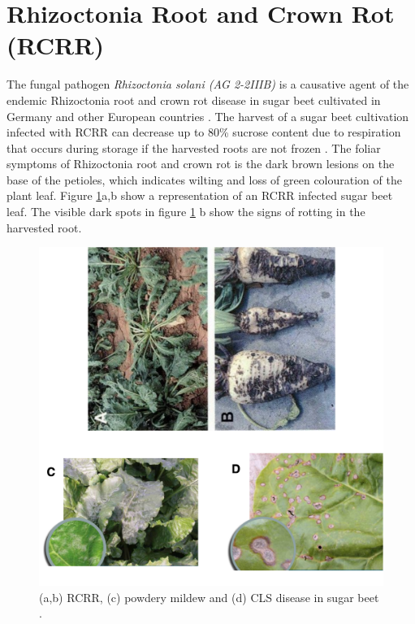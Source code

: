 \section{Rhizoctonia Root and Crown Rot (RCRR)} 
The fungal pathogen \textit{Rhizoctonia solani (AG 2-2IIIB)} is a causative agent of the endemic Rhizoctonia root and crown rot disease in sugar beet cultivated in Germany and other European countries \cite{buhre2009integrated}. The harvest of a sugar beet cultivation infected with RCRR can decrease up to 80\% sucrose content due to respiration that occurs during storage if the harvested roots are not frozen \cite{campbell2014postharvest}.
The foliar symptoms of Rhizoctonia root and crown rot is the dark brown lesions on the base of the petioles, which indicates wilting and loss of green colouration of the plant leaf. Figure \ref{fig:disease}a,b show a representation of an RCRR infected sugar beet leaf. The visible dark spots in figure \ref{fig:disease} b show the signs of rotting in the harvested root.


    \begin{figure}[htbp]
        \centerline{\includegraphics[scale=0.4]{figure/Untitled2.png}}
        \caption{(a,b) RCRR, (c) powdery mildew and (d) CLS disease in sugar beet \cite{articleHarveson}.}

        \label{fig:disease}
    \end{figure}

